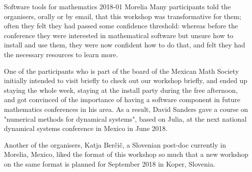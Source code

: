 \begin{event}{Software tools for mathematics 2018-01 Morelia}
Many participants told the organisers, orally or by email, that this workshop
was transformative for them; often they felt they had passed some confidence
threshold: whereas before the conference they were interested in mathematical
software but unsure how to install and use them, they were now confident how
to do that, and felt they had the necessary resources to learn more.

One of the participants who is part of the board of the Mexican Math Society
initially intended to visit briefly to check out our workshop briefly, and
ended up staying the whole week, staying at the install party during the free
afternoon, and got convinced of the importance of having a software component
in future mathematics conferences in his area. As a result, David Sanders
gave a course on "numerical methods for dynamical systems", based on Julia,
at the next national dynamical systems conference in Mexico in June 2018.

Another of the organisers, Katja Berčič, a Slovenian post-doc currently in
Morelia, Mexico, liked the format of this workshop so much that a new workshop
on the same format is planned for September 2018 in Koper, Slovenia.


\end{event}